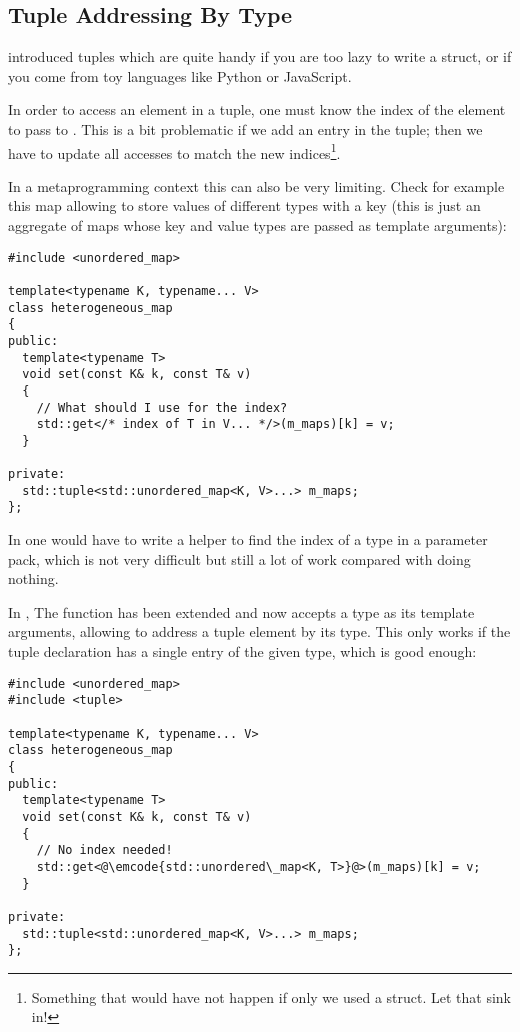 \subsection{Tuple Addressing By Type}

\problemtitle

 introduced tuples  which are quite handy if
you are too lazy to write a struct, or if you come from toy languages
like Python or JavaScript.

In order to access an element in a tuple, one must know the index of
the element to pass to . This is a bit problematic if
we add an entry in the tuple; then we have to update all
accesses to match the new indices\footnote{Something that would have
not happen if only we used a struct. Let that sink in!}.

In a metaprogramming context this can also be very limiting. Check for
example this map allowing to store values of different types with a
key (this is just an aggregate of maps whose key and value types are
passed as template arguments):

\begin{lstlisting}
#include <unordered_map>

template<typename K, typename... V>
class heterogeneous_map
{
public:
  template<typename T>
  void set(const K& k, const T& v)
  {
    // What should I use for the index?
    std::get</* index of T in V... */>(m_maps)[k] = v;
  }

private:
  std::tuple<std::unordered_map<K, V>...> m_maps;
};
\end{lstlisting}

In  one would have to write a helper to find the index of a type
in a parameter pack, which is not very difficult but still a lot of
work compared with doing nothing.

\solutiontitle

In , The  function has been extended and now
accepts a type as its template arguments, allowing to address a tuple
element by its type. This only works if the tuple declaration has a
single entry of the given type, which is good enough:

\begin{lstlisting}
#include <unordered_map>
#include <tuple>

template<typename K, typename... V>
class heterogeneous_map
{
public:
  template<typename T>
  void set(const K& k, const T& v)
  {
    // No index needed!
    std::get<@\emcode{std::unordered\_map<K, T>}@>(m_maps)[k] = v;
  }

private:
  std::tuple<std::unordered_map<K, V>...> m_maps;
};
\end{lstlisting}
